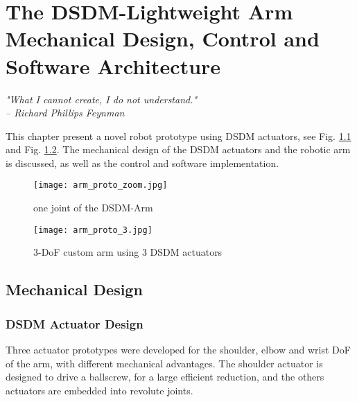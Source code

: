 \chapter{The DSDM-Lightweight Arm \\ { \large Mechanical Design, Control and Software Architecture } }
\label{sec:ExperimentalValidation}

{
\begin{flushright}
\textit{"What I cannot create, I do not understand."} \\ 
\emph{-- Richard Phillips Feynman}
\end{flushright}
}
\vspace{10pt}



This chapter present a novel robot prototype using DSDM actuators, see Fig. \ref{fig:dsdm_arm_zoom} and Fig. \ref{fig:dsdm_arm}. The mechanical design of the DSDM actuators and the robotic arm is discussed, as well as the control and software implementation.

\begin{figure}[htb]
	\centering
		\texttt{[image: arm\_proto\_zoom.jpg]}
	\caption{one joint of the DSDM-Arm}
	\label{fig:dsdm_arm_zoom}
\end{figure}

\begin{figure}[htp]
	\centering
		\texttt{[image: arm\_proto\_3.jpg]}
	\caption{3-DoF custom arm using 3 DSDM actuators}
	\label{fig:dsdm_arm}
\end{figure}


\section{Mechanical Design}

\subsection{DSDM Actuator Design}
\label{sec:ActuatorDesign}
 
Three actuator prototypes were developed for the shoulder, elbow and wrist DoF of the arm, with different mechanical advantages. The shoulder actuator is designed to drive a ballscrew, for a large efficient reduction, and the others actuators are embedded into revolute joints. 

